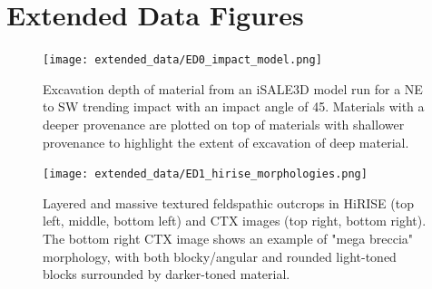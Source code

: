 \documentclass[12pt]{article}
\newenvironment{figurehere}[1][0.85]
  {\begin{figure}[p]
   \begin{minipage}[c][0.80\textheight][c]{\linewidth}
   \centering
   \setlength{\textfloatsep}{0pt}}
  {\end{minipage}
   \end{figure}}
\begin{document}
\setlength{\parindent}{0em} %

\vspace*{\fill}
\section*{\centering Extended Data Figures}
\vspace*{\fill}

\newpage

\begin{figurehere}
    \texttt{[image: extended\_data/ED0\_impact\_model.png]}
    \caption[iSALE3D impact model results.]{Excavation depth of material from an iSALE3D model run for a NE to SW trending impact with an impact angle of 45\degree. Materials with a deeper provenance are plotted on top of materials with shallower provenance to highlight the extent of excavation of deep material.}
    \label{fig:extended_data_figure1}
\end{figurehere}

\clearpage
\begin{figurehere}
    \texttt{[image: extended\_data/ED1\_hirise\_morphologies.png]}
    \caption[Layered and massive textured feldspathic outcrops in HiRISE and CTX images.]{Layered and massive textured feldspathic outcrops in HiRISE (top left, middle, bottom left) and CTX images (top right, bottom right). The bottom right CTX image shows an example of "mega breccia" morphology, with both blocky/angular and rounded light-toned blocks surrounded by darker-toned material.}
    \label{fig:extended_data_figure1}
\end{figurehere}

\clearpage
\end{document}
